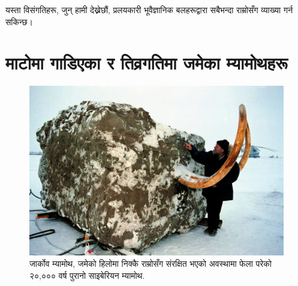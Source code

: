 \documentclass[10pt,twocolumn,letterpaper]{article}
\begin{document}
यस्ता विसंगतिहरू, जुन् हामी देख्नेछौं, प्रलयकारी भूवैज्ञानिक बलहरूद्वारा सबैभन्दा राम्रोसँग व्याख्या गर्न सकिन्छ।

\section{माटोमा गाडिएका र तिव्रगतिमा जमेका म्यामोथहरू}

\begin{figure}[t]
\begin{center}
   \includegraphics[width=1\linewidth]{jarkov-mammoth.jpg}
\end{center}
   \caption{जार्कोव म्यामोथ, जमेको हिलोमा निक्कै राम्रोसँग संरक्षित भएको अवस्थामा फेला परेको २०,००० वर्ष पुरानो साइबेरियन म्यामोथ\cite{51}.}
\label{fig:1}
\label{fig:onecol}
\end{figure}
\end{document}
